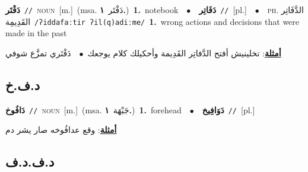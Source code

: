 \documentclass[10pt,a4paper,twoside]{article} %
\begin{document}
\begin{multicols}{2}
{\setlength\topsep{0pt}\textbf{\foreignlanguage{arabic}{دَفْتَر}}\ {\color{gray}\texttt{//}\color{black}}\ \textsc{noun}\ [m.]\ \color{gray}(msa. \foreignlanguage{arabic}{دَفْتَر}~\foreignlanguage{arabic}{\textbf{١.}})\color{black}\ \textbf{1.}~notebook\ \ $\bullet$\ \ \setlength\topsep{0pt}\textbf{\foreignlanguage{arabic}{دَفَاتِر}}\ {\color{gray}\texttt{//}\color{black}}\ [pl.]\ \ $\bullet$\ \ \textsc{ph.} \color{gray} \foreignlanguage{arabic}{الدَّفَاتِر القَدِيمِة}\color{black}\ {\color{gray}\texttt{/{\sffamily ʔiddafaːtir ʔil(q)adiːme}/}\color{black}}\ \textbf{1.}~wrong actions and decisions that were made in the past\  \begin{flushright}\color{gray}\foreignlanguage{arabic}{\textbf{\underline{\foreignlanguage{arabic}{أمثلة}}}: تخلينيش أفتح الدَّفاتِر القَدِيمة وأحكيلك كلام يوجعك\ $\bullet$\ \  دَفْتَري تمزَّع شوفي}\end{flushright}\color{black}} \vspace{2mm}

\vspace{-3mm}
\subsection*{\color{blue}\foreignlanguage{arabic}{د.ف.خ}\color{blue}{}} 

{\setlength\topsep{0pt}\textbf{\foreignlanguage{arabic}{دَافُوخ}}\ {\color{gray}\texttt{//}\color{black}}\ \textsc{noun}\ [m.]\ \color{gray}(msa. \foreignlanguage{arabic}{جَبْهَة}~\foreignlanguage{arabic}{\textbf{١.}})\color{black}\ \textbf{1.}~forehead\ \ $\bullet$\ \ \setlength\topsep{0pt}\textbf{\foreignlanguage{arabic}{دَوَافِيخ}}\ {\color{gray}\texttt{//}\color{black}}\ [pl.]\  \begin{flushright}\color{gray}\foreignlanguage{arabic}{\textbf{\underline{\foreignlanguage{arabic}{أمثلة}}}: وقع عدافُوخه صار يشر دم}\end{flushright}\color{black}} \vspace{2mm}

\vspace{-3mm}
\subsection*{\color{blue}\foreignlanguage{arabic}{د.ف.د.ف}\color{blue}{}} 


\end{multicols}
\end{document}
